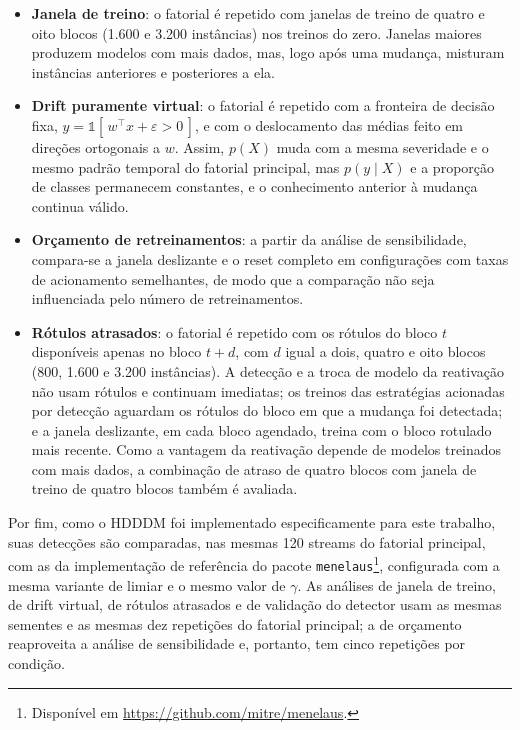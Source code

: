 \begin{itemize}
  \item \textbf{Janela de treino}: o fatorial é repetido com janelas de
  treino de quatro e oito blocos (1.600 e 3.200 instâncias) nos treinos do
  zero. Janelas maiores produzem modelos com mais dados, mas, logo após uma
  mudança, misturam instâncias anteriores e posteriores a ela.
  \item \textbf{Drift puramente virtual}: o fatorial é repetido com a
  fronteira de decisão fixa, $y = \mathbb{1}[\,w^\top x + \varepsilon > 0\,]$,
  e com o deslocamento das médias feito em direções ortogonais a $w$. Assim,
  $p(X)$ muda com a mesma severidade e o mesmo padrão temporal do fatorial
  principal, mas $p(y \mid X)$ e a proporção de classes permanecem
  constantes, e o conhecimento anterior à mudança continua válido.
  \item \textbf{Orçamento de retreinamentos}: a partir da análise de
  sensibilidade, compara-se a janela deslizante e o reset completo em
  configurações com taxas de acionamento semelhantes, de modo que a
    comparação não seja influenciada pelo número de retreinamentos.
  \item \textbf{Rótulos atrasados}: o fatorial é repetido com os rótulos do
  bloco $t$ disponíveis apenas no bloco $t + d$, com $d$ igual a dois, quatro
  e oito blocos (800, 1.600 e 3.200 instâncias). A detecção e a troca de
  modelo da reativação não usam rótulos e continuam imediatas; os treinos das
  estratégias acionadas por detecção aguardam os rótulos do bloco em que a
  mudança foi detectada; e a janela deslizante, em cada bloco agendado,
  treina com o bloco rotulado mais recente. Como a vantagem da reativação
  depende de modelos treinados com mais dados, a combinação de atraso de
  quatro blocos com janela de treino de quatro blocos também é avaliada.
\end{itemize}

Por fim, como o HDDDM foi implementado especificamente para este trabalho,
suas detecções são comparadas, nas mesmas 120 streams do fatorial principal,
com as da implementação de referência do pacote
\texttt{menelaus}\footnote{Disponível em
\url{https://github.com/mitre/menelaus}.}, configurada com a mesma variante
de limiar e o mesmo valor de $\gamma$. As análises de janela de treino, de
drift virtual, de rótulos atrasados e de validação do detector usam as
mesmas sementes e as mesmas dez repetições do fatorial principal; a de
orçamento reaproveita a análise de sensibilidade e, portanto, tem cinco
repetições por condição.

